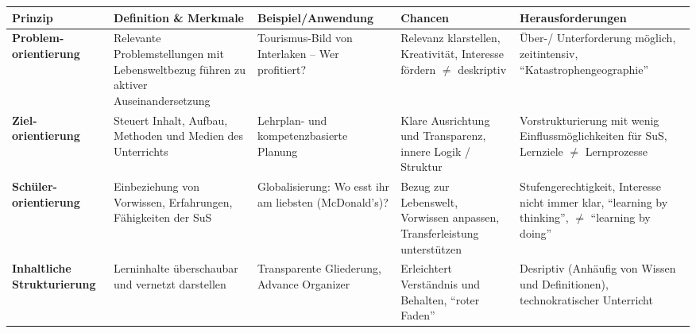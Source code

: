 \begin{landscape}
  \begin{table}[h!]
    \centering
    \begin{tabular}{@{}>{\bfseries}p{2.5cm}|p{5cm}|p{4.4cm}|p{5.3cm}|p{5.2cm}@{}}

      \textbf{Prinzip}                    & \textbf{Definition \& Merkmale}                                                      & \textbf{Beispiel/Anwendung}                                                & \textbf{Chancen}                                                                                                       & \textbf{Herausforderungen}                                                                                          \\
      \midrule\midrule
      Problem-\newline orientierung       & Relevante Problemstellungen mit Lebensweltbezug führen zu aktiver Auseinandersetzung & Tourismus-Bild von Interlaken -- Wer profitiert?                            & Relevanz klarstellen, Kreativität, Interesse fördern $\neq$ deskriptiv                                                 & Über-/ Unterforderung möglich, zeitintensiv, \enquote{Katastrophengeographie}                                             \\\midrule
      Ziel-\newline orientierung          & Steuert Inhalt, Aufbau, Methoden und Medien des Unterrichts                          & Lehrplan- und kompetenzbasierte Planung                                    & Klare Ausrichtung und Transparenz, innere Logik / Struktur                                                             & Vorstrukturierung mit wenig Einflussmöglichkeiten für SuS, Lernziele $\neq$ Lernprozesse                            \\\midrule
      Schüler-\newline orientierung       & Einbeziehung von Vorwissen, Erfahrungen, Fähigkeiten der SuS                         & Globalisierung: Wo esst ihr am liebsten (McDonald's)?                      & Bezug zur Lebenswelt, Vorwissen anpassen, Transferleistung unterstützen                                                & Stufengerechtigkeit, Interesse nicht immer klar, \enquote{learning by thinking}, $\neq$ \enquote{learning by doing} \\\midrule
      Inhaltliche \newline Strukturierung & Lerninhalte überschaubar und vernetzt darstellen                                     & Transparente Gliederung, Advance Organizer                                 & Erleichtert Verständnis und Behalten, \enquote{roter Faden}                                                            & Desriptiv (Anhäufig von Wissen und Definitionen), technokratischer Unterricht                                       \\\midrule

\end{tabular}
\end{table}
\end{landscape}

